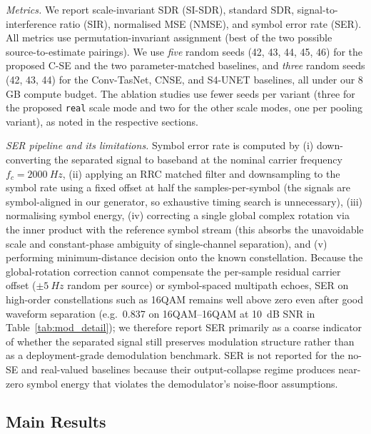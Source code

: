 \documentclass[twocolumn,english]{svjour3}
\begin{document}
\emph{Metrics.} We report scale-invariant SDR (SI-SDR), standard SDR, signal-to-interference ratio (SIR), normalised MSE (NMSE), and symbol error rate (SER). All metrics use permutation-invariant assignment (best of the two possible source-to-estimate pairings). We use \emph{five} random seeds (42, 43, 44, 45, 46) for the proposed C-SE and the two parameter-matched baselines, and \emph{three} random seeds (42, 43, 44) for the Conv-TasNet, CNSE, and S4-UNET baselines, all under our 8\,GB compute budget. The ablation studies use fewer seeds per variant (three for the proposed \texttt{real} scale mode and two for the other scale modes, one per pooling variant), as noted in the respective sections.

\emph{SER pipeline and its limitations.} Symbol error rate is computed by (i) down-converting the separated signal to baseband at the nominal carrier frequency $f_c=\SI{2000}{Hz}$, (ii) applying an RRC matched filter and downsampling to the symbol rate using a fixed offset at half the samples-per-symbol (the signals are symbol-aligned in our generator, so exhaustive timing search is unnecessary), (iii) normalising symbol energy, (iv) correcting a single global complex rotation via the inner product with the reference symbol stream (this absorbs the unavoidable scale and constant-phase ambiguity of single-channel separation), and (v) performing minimum-distance decision onto the known constellation. Because the global-rotation correction cannot compensate the per-sample residual carrier offset ($\pm \SI{5}{Hz}$ random per source) or symbol-spaced multipath echoes, SER on high-order constellations such as 16QAM remains well above zero even after good waveform separation (e.g.\ \num{0.837} on 16QAM--16QAM at \SI{10}{dB} SNR in Table~\ref{tab:mod_detail}); we therefore report SER primarily as a coarse indicator of whether the separated signal still preserves modulation structure rather than as a deployment-grade demodulation benchmark. SER is not reported for the no-SE and real-valued baselines because their output-collapse regime produces near-zero symbol energy that violates the demodulator's noise-floor assumptions.

\subsection{Main Results}
\end{document}
